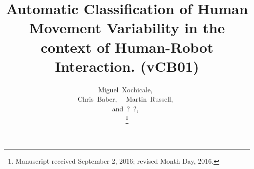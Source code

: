 \documentclass[9pt,journal,onecolumn,compsoc]{IEEEtran}
\begin{document}
%
\title{
  Automatic Classification of  Human Movement Variability  in the context of  Human-Robot Interaction. (vCB01)
}



%
%

\author{
 	Miguel~Xochicale,~\\
         Chris~Baber,~
         ~Martin~Russell,~ \\
         and~?~?,~

\thanks{Manuscript received September 2, 2016; revised Month Day, 2016.}
}
\end{document}
